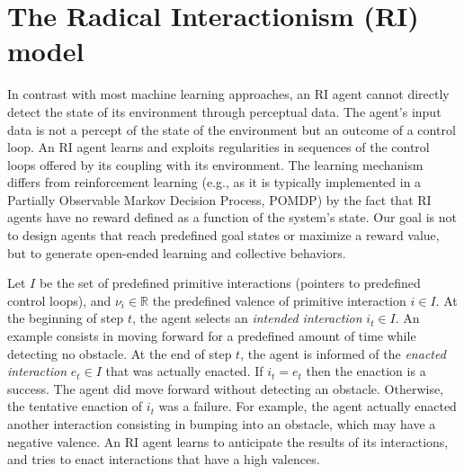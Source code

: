 \documentclass[conference]{IEEEtran}
\begin{document}
\section{The Radical Interactionism (RI) model}


In contrast with most machine learning approaches, an RI agent cannot directly detect the state of its environment through perceptual data. 
The agent's input data is not a percept of the state of the environment but an outcome of a control loop. 
An RI agent learns and exploits regularities in sequences of the control loops offered by its coupling with its environment.  
The learning mechanism differs from reinforcement learning (e.g., as it is typically implemented in a Partially Observable Markov Decision Process, POMDP) by the fact that RI agents have no reward defined as a function of the system's state. 
Our goal is not to design agents that reach predefined goal states or maximize a reward value, but to generate open-ended learning and collective behaviors.

Let $I$ be the set of predefined primitive interactions (pointers to predefined control loops), and $\nu_i \in \mathbb{R}$ the predefined valence of primitive interaction $i \in I$.
At the beginning of step $t$, the agent selects an \textit{intended interaction} $i_t \in I$. 
An example consists in moving forward for a predefined amount of time while detecting no obstacle.
At the end of step $t$, the agent is informed of the \textit{enacted interaction} $e_t \in I$ that was actually enacted. 
If $i_t = e_t$ then the enaction is a success. The agent did move forward without detecting an obstacle. 
Otherwise, the tentative enaction of $i_t$ was a failure. 
For example, the agent actually enacted another interaction consisting in bumping into an obstacle, which may have a negative valence.
An RI agent learns to anticipate the results of its interactions, and tries to enact interactions that have a high valences.
\end{document}
